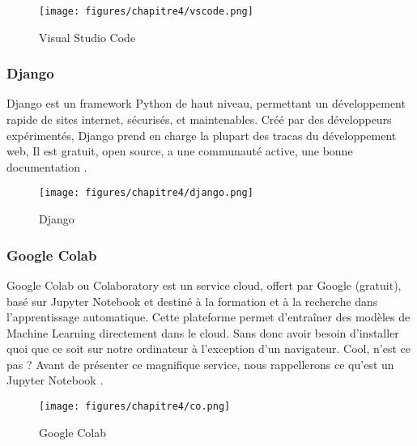         \begin{figure}[H]
        	\begin{center}
        		\texttt{[image: figures/chapitre4/vscode.png]}
        	\end{center}
        	\caption {Visual Studio Code}
        	\label{fig:vscode}
        \end{figure}          

        \subsubsection{Django }
        \par Django est un framework Python de haut niveau, permettant un développement rapide de sites internet, sécurisés, et maintenables. Créé par des développeurs expérimentés, Django prend en charge la plupart des tracas du développement web, Il est gratuit, open source, a une communauté active, une bonne documentation \cite{django}.
        
        \begin{figure}[H]
        	\begin{center}
        		\texttt{[image: figures/chapitre4/django.png]}
        	\end{center}
        	\caption {Django}
        	\label{fig:django}
        \end{figure}         
        
        \subsubsection{Google Colab}
        \par Google Colab  ou Colaboratory est un service cloud, offert par Google (gratuit), basé sur Jupyter Notebook et destiné à la formation et à la recherche dans l’apprentissage automatique. Cette plateforme permet d’entraîner des modèles de Machine Learning directement dans le cloud. Sans donc avoir besoin d’installer quoi que ce soit sur notre ordinateur à l’exception d’un navigateur. Cool, n’est ce pas ? Avant de présenter ce magnifique service, nous rappellerons ce qu’est un Jupyter Notebook \cite{ggcolabjptr}.
        
        \begin{figure}[H]
        	\begin{center}
        		\texttt{[image: figures/chapitre4/co.png]}
        	\end{center}
        	\caption {Google Colab}
        	\label{fig:ggcolab}
        \end{figure}  
        
